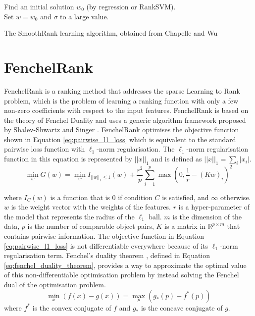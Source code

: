 \LinesNumbered
\begin{algorithm}[H]
 Find an initial solution $w_0$ (by regression or Rank\acs{SVM}).\\
 Set $w = w_0$ and $\sigma$ to a large value.\\
 \caption{The SmoothRank learning algorithm, obtained from Chapelle and Wu \cite{Chapelle2010}}
 \label{alg:smoothrank}
\end{algorithm}

\section{FenchelRank}
FenchelRank \cite{Lai2013} is a ranking method that addresses the sparse Learning to Rank problem, which is the problem of learning a ranking function with only a few non-zero coefficients with respect to the input features. FenchelRank is based on the theory of Fenchel Duality \cite{Rifkin2007} and uses a generic algorithm framework proposed by Shalev-Shwartz and Singer \cite{Shalev-Shwartz2010}. FenchelRank optimises the objective function shown in Equation \ref{eq:pairwise_l1_loss} which is equivalent to the standard pairwise loss function with $\ell_1$-norm regularisation. The $\ell_1$-norm regularisation function in this equation is represented by $||x||_1$ and is defined as $||x||_1=\sum\nolimits_i|x_i|$.
\begin{equation}
\min_w G(w) = \min_w I_{||w||_{1} \le 1}(w) + \frac{r^2}{p} \sum\limits_{i=1}^{p}\max(0,\frac{1}{r}-(Kw)_i)^2
\label{eq:pairwise_l1_loss}
\end{equation}

\noindent where $I_{C}(w)$ is a function that is 0 if condition $C$ is satisfied, and $\infty$ otherwise. $w$ is the weight vector with the weights of the features. $r$ is a hyper-parameter of the model that represents the radius of the $\ell_1$ ball. $m$ is the dimension of the data, $p$ is the number of comparable object pairs, $K$ is a matrix in $\mathbb{R}^{p \times m}$ that contains pairwise information. The objective function in Equation \ref{eq:pairwise_l1_loss} is not differentiable everywhere because of its $\ell_1$-norm regularisation term. Fenchel's duality theorem \cite{Rifkin2007}, defined in Equation \ref{eq:fenchel_duality_theorem}, provides a way to approximate the optimal value of this non-differentiable optimisation problem by instead solving the Fenchel dual of the optimisation problem.
\begin{equation}
\min_x(f(x)-g(x)) = \max_p(g_*(p)-f^*(p))
\label{eq:fenchel_duality_theorem}
\end{equation}
\noindent where $f^*$ is the convex conjugate of $f$ and $g_*$ is the concave conjugate of $g$.\\

